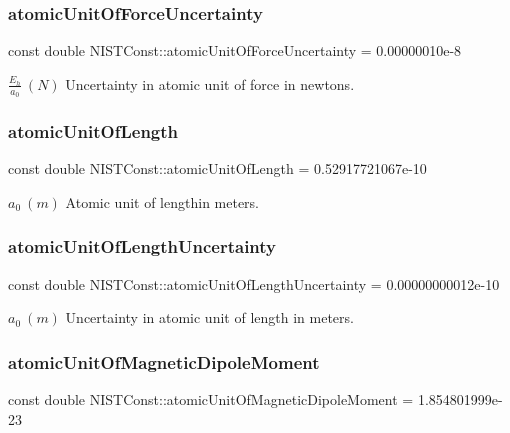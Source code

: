 \subsubsection{\texorpdfstring{atomic\+Unit\+Of\+Force\+Uncertainty}{atomicUnitOfForceUncertainty}}
{\footnotesize\ttfamily const double N\+I\+S\+T\+Const\+::atomic\+Unit\+Of\+Force\+Uncertainty = 0.\+00000010e-\/8}

$\frac{E_h}{a_0} \ (N)$ Uncertainty in atomic unit of force in newtons. \mbox{\label{group___n_i_s_t_const-_atomic_unit_ga246e4c3edecdd5aa1d5d208fc02a4636}} 
\subsubsection{\texorpdfstring{atomic\+Unit\+Of\+Length}{atomicUnitOfLength}}
{\footnotesize\ttfamily const double N\+I\+S\+T\+Const\+::atomic\+Unit\+Of\+Length = 0.\+52917721067e-\/10}

$a_0 \ (m)$ Atomic unit of lengthin meters. \mbox{\label{group___n_i_s_t_const-_atomic_unit_gafc60ae3e5ac09e358e8c6fdf1358e592}} 
\subsubsection{\texorpdfstring{atomic\+Unit\+Of\+Length\+Uncertainty}{atomicUnitOfLengthUncertainty}}
{\footnotesize\ttfamily const double N\+I\+S\+T\+Const\+::atomic\+Unit\+Of\+Length\+Uncertainty = 0.\+00000000012e-\/10}

$a_0 \ (m)$ Uncertainty in atomic unit of length in meters. \mbox{\label{group___n_i_s_t_const-_atomic_unit_ga56b280760cc855923e548c6676d90916}} 
\subsubsection{\texorpdfstring{atomic\+Unit\+Of\+Magnetic\+Dipole\+Moment}{atomicUnitOfMagneticDipoleMoment}}
{\footnotesize\ttfamily const double N\+I\+S\+T\+Const\+::atomic\+Unit\+Of\+Magnetic\+Dipole\+Moment = 1.\+854801999e-\/23}

